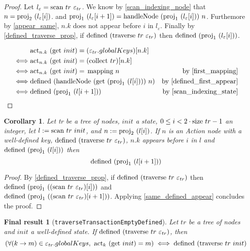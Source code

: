 \documentclass{article}
\newtheorem{corollary}[lemma]{Corollary}
\newtheorem*{res}{Final result}
\newcommand{\textfun}[1]{\textup{#1}}
\newcommand{\textcode}[1]{\texttt{#1}}
\newcommand{\traverse}[2]{\textfun{traverse}\ #1\ #2}
\newcommand{\scan}[2]{\textfun{scan}\ #1\ #2}
\newcommand{\collect}[1]{\textfun{collect}\ #1}
\newcommand{\hNode}[2]{\textfun{handleNode}\ #1\ #2}
\newcommand{\defined}[1]{\textfun{defined}\ #1}
\newcommand{\get}[1]{\textfun{get}\ #1}
\newcommand{\mapping}[1]{\textfun{mapping}\ #1}
\newcommand{\size}[1]{\textfun{size}\ #1}
\newcommand{\fst}[1]{\textfun{proj}_1\ #1}
\newcommand{\snd}[1]{\textfun{proj}_2\ #1}
\newcommand{\actkey}[2]{\textfun{act}_{#1}\ #2}
\newcommand{\emptyState}[1]{\varepsilon_{#1}}
\begin{document}
\begin{proof}
    Let $l_{\varepsilon} = \scan{tr}{\emptyState{tr}}$. We know by \cref{scan_indexing_node} that $n = \snd{(l_{\varepsilon}[i])}$.
     and $\fst{(l_\varepsilon[i + 1])} = \hNode{(\fst{(l_\varepsilon[i])})}{n}$.
    Furthemore by \cref{appear_same}, $n.k$ does not appear before $i$ in $l_{\varepsilon}$. Finally by \cref{defined_traverse_prop}, if $\defined{(\traverse{tr}{\emptyState{tr}})}$ then $\defined{(\fst{(l_{\varepsilon}[i])})}$.
    
    \begin{align*}
        &\actkey{n.k}{(\get{init})} = (\emptyState{tr}.globalKeys)[n.k] \\
        \iff &\actkey{n.k}{(\get{init})} = (\collect{tr})[n.k] \\
        \iff &\actkey{n.k}{(\get{init})} =\, \mapping{n} &\text{by \cref{first_mapping}} \\
        \iff &\defined{(\hNode{(\get{(\fst{(l[i])})})}{n})} &\text{by \cref{defined_first_appear}}\\
        \iff &\defined{(\fst{(l[i + 1])})} &\text{by \cref{scan_indexing_state}}
    \end{align*}
\end{proof}

\begin{corollary}
    \label{defined_empty_traverse}
    Let tr be a tree of nodes, $init$ a state, $0 \leq i < 2\cdot \size{tr} - 1$ an integer, let $l := \scan{tr}{init}$, and $n := \snd{(l[i])}$. 
   If $n$ is an Action node with a well-defined key, $\defined{(\traverse{tr}{\emptyState{tr}})}$, $n.k$ appears before $i$ in $l$ and $\defined{(\fst{(l[i])})}$ then 
   \[\defined{(\fst{(l[i + 1])})}\]
\end{corollary}

\begin{proof}
    By \cref{defined_traverse_prop}, if $\defined{(\traverse{tr}{\emptyState{tr}})}$ then $\defined{(\fst{((\scan{tr}{\emptyState{tr}})[i])})}$ and \\
    $\defined{(\fst{((\scan{tr}{\emptyState{tr}})[i + 1])})}$. Applying \cref{same_defined_appear} concludes the proof.
\end{proof}


\begin{res}[\textcode{traverseTransactionEmptyDefined}]
    Let $tr$ be a tree of nodes and $init$ a well-defined state. If $\defined{(\traverse{tr}{\emptyState{tr}})}$, then
    \[ (\forall (k \to m) \in \emptyState{tr}.globalKeys,\ \actkey{k}{(\get{init})} = m) \iff \defined{(\traverse{tr}{init})}  \]  
\end{res}
\end{document}
